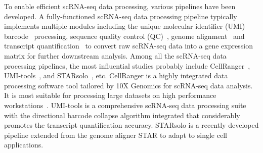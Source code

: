 \documentclass[conference]{IEEEtran}
\begin{document}

To enable efficient scRNA-seq data processing, various pipelines have been developed.
A fully-functioned scRNA-seq data processing pipeline typically implements multiple modules including the unique molecular identifier (UMI) barcode~\cite{Smith2017UMItools} processing, sequence quality control (QC)~\cite{schmieder2011quality}, genome alignment~\cite{Dobin2013STAR,Kim2015HISAT} and transcript quantification~\cite{Parekh2018zUMIs} to convert raw scRNA-seq data into a gene expression matrix for further downstream analysis. 
Among all the scRNA-seq data processing pipelines, the most influential studies probably include CellRanger~\cite{Zheng2017Massively}, UMI-tools~\cite{Smith2017UMItools}, and STARsolo~\cite{Blibaum2019STARsolo}, etc. 
CellRanger is a highly integrated data processing software tool tailored by 10X Genomics for scRNA-seq data analysis.
It is most suitable for processing large datasets on high performance workstations~\cite{Gao2020Comparison}. 
UMI-tools is a comprehensive scRNA-seq data processing suite with the directional barcode collapse algorithm integrated that considerably promotes the transcript quantification accuracy.
STARsolo is a recently developed pipeline extended from the genome aligner STAR to adapt to single cell applications. 
\end{document}
